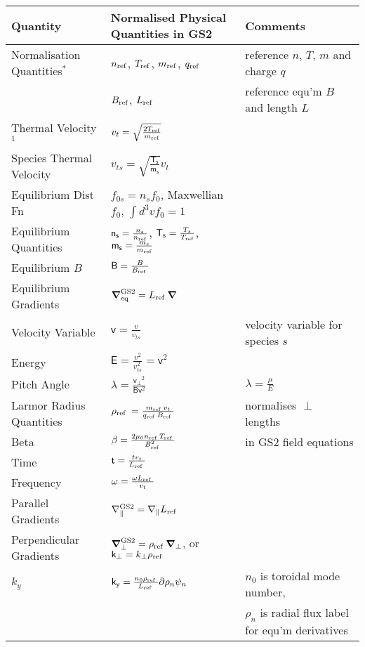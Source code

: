 \documentclass[10pt,a4paper]{article}
\newcommand{\dd}{\partial}
\newcommand{\grad}{{\bfm \nabla}}
\newcommand{\bfm}[1]{\mbox{{\boldmath $ { #1}$}}}
\newcommand{\ggp}{\nabla_{\parallel}^{\rm GS2}}
\newcommand{\gradeq}{\bfm{\nabla}^{\rm GS2}_{\rm eq}}
\newcommand{\gperp}{\bfm{\nabla}^{\rm GS2}_{\perp}}
\newcommand{\n}[1]{{#1}_{\rm ref\;}}
\newcommand{\g}[1]{\mathsf{#1}}
\begin{document}
\small
\linespread{1.5}
\begin{table}[htb]
\begin{tabular}{|l|l|l|}
\hline
Quantity & Normalised Physical Quantities in GS2 &  Comments \\
\hline
Normalisation Quantities$^{\ast}$ & $n_{\rm ref}$, $T_{\rm ref}$, $m_{\rm
  ref}$, $q_{\rm ref}$ & reference $n$, $T$, $m$ and charge $q$ \\
                                  & $B_{\rm ref}$, $L_{\rm ref}$ & reference
                                  equ'm $B$ and length $L$ \\
Thermal Velocity$^{1}$ & $v_t = \sqrt{\frac{2 T_{\rm ref}}{m_{\rm ref}}}$  & \\
Species Thermal Velocity & $v_{ts}=\sqrt{\frac{\g{T_s}}{\g{m_s}}} v_t$ & \\
Equilibrium Dist Fn & $f_{0s}=n_s f_{0}$, Maxwellian $f_0$, $\int d^3v f_0 = 1$ &   \\
\hline
Equilibrium Quantities & $\g{n_s}=\frac{n_s}{n_{\rm ref}}$, $\g{T_s} =
\frac{T_s}{T_{\rm ref}}$, $\g{m_s} = \frac{m_s}{m_{\rm ref}}$ & \\
Equilibrium $B$ & $\g{B}=\frac{B}{\n{B}}$ & \\
Equilibrium Gradients & $\gradeq=\n{L} \grad$ & \\
Velocity Variable        & $\g{v} = \frac{v}{v_{ts}}$  & velocity variable for
species $s$ \\
Energy & $\g{E} = \frac{v^2}{v_{ts}^2} = \g{v}^2$ & \\
Pitch Angle & $\g{\lambda} = \frac{\g{v_{\perp}}^2}{\g{B} \g{v}^2}$ & $\lambda
= \frac{\mu}{E}$ \\
Larmor Radius Quantities & $\n{\rho} = \frac{\n{m} v_t}{\n{q} \n{B}}$ &
normalises $\perp$ lengths \\
Beta &  $\g{\beta} = \frac{2 \mu_0 \n{n} \n{T}}{\n{B}^2}$ & in GS2 field equations \\
Time &  $\g{t} = \frac{t v_t}{\n{L}}$ & \\
Frequency &  $\g{\omega} = \frac{ \omega \n{L}}{v_t}$ & \\
Parallel Gradients & $\ggp = \nabla_{\parallel} \n{L}$ &  \\
Perpendicular Gradients & $\gperp = \n{\rho}\grad_{\perp}$, or  $\g{k_{\perp}}
= k_{\perp} \n{\rho}$ &  \\
$k_y$ & $\g{k_y} = \frac{n_0 \n{\rho}}{\n{L}} \dd{\rho_n}{\psi_n}$ & $n_0$ is
toroidal mode number, \\
& & $\rho_n$ is radial flux label for equ'm derivatives \\

\end{tabular}
\end{table}
\end{document}
